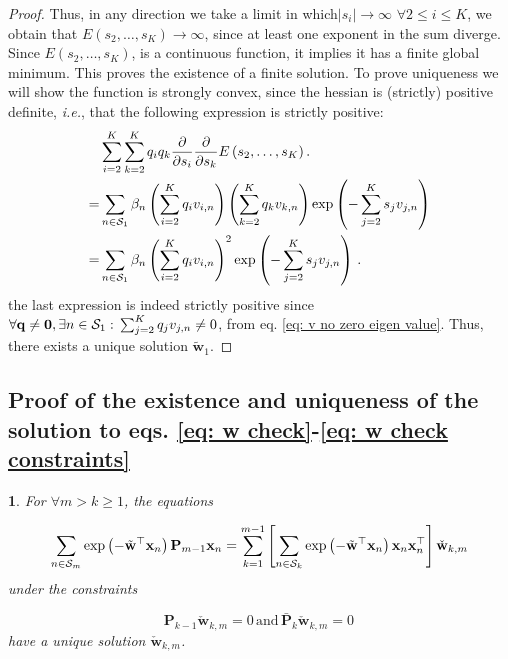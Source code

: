 \documentclass[twoside,11pt,english]{article}
\newtheorem{lem}[thm]{\protect\lemmaname}
\providecommand{\lemmaname}{Lemma}
\providecommand{\lemmaname}{Lemma}
\begin{document}
{\begin{proof}
Thus, in any direction we take a limit in which$\left|s_{i}\right|\rightarrow\infty$
$\forall2\leq i\leq K$, we obtain that $E\left(s_{2},\dots,s_{K}\right)\rightarrow\infty$,
since at least one exponent in the sum diverge. Since $E\left(s_{2},\dots,s_{K}\right)$,
is a continuous function, it implies it has a finite global minimum.
This proves the existence of a finite solution. To prove uniqueness
we will show the function is strongly convex, since the hessian is
(strictly) positive definite, \emph{i.e.}, that the following expression
is strictly positive: 
\begin{align*}
 & \sum_{i=2}^{K}\sum_{k=2}^{K}q_{i}q_{k}\frac{\partial}{\partial s_{i}}\frac{\partial}{\partial s_{k}}E\left(s_{2},\dots,s_{K}\right).\\
= & \sum_{n\in\mathcal{S}_{1}}\beta_{n}\left(\sum_{i=2}^{K}q_{i}v_{i,n}\right)\left(\sum_{k=2}^{K}q_{k}v_{k,n}\right)\exp\left(-\sum_{j=2}^{K}s_{j}v_{j,n}\right)\\
= & \sum_{n\in\mathcal{S}_{1}}\beta_{n}\left(\sum_{i=2}^{K}q_{i}v_{i,n}\right)^{2}\exp\left(-\sum_{j=2}^{K}s_{j}v_{j,n}\right)\,.
\end{align*}
the last expression is indeed strictly positive since $\forall\mathbf{q}\neq\mathbf{0},\exists n\in\mathcal{S}_{1}:\,\sum_{j=2}^{K}q_{j}v_{j,n}\neq0$,
from eq. \ref{eq: v no zero eigen value}. Thus, there exists a unique
solution $\tilde{\mathbf{w}}_{1}$. 
\end{proof}

\subsection{Proof of the existence and uniqueness of the solution to eqs. \ref{eq: w check}-\ref{eq: w check constraints}\label{subsec: existence 2}}
\begin{lem}
For $\forall m>k\geq1$, the equations

\begin{equation}
\sum_{n\in\mathcal{S}_{m}}\exp\left(-\tilde{\mathbf{w}}^{\top}\mathbf{x}_{n}\right)\mathbf{P}_{m-1}\mathbf{x}_{n}=\sum_{k=1}^{m-1}\left[\sum_{n\in\mathcal{S}_{k}}\exp\left(-\tilde{\mathbf{w}}^{\top}\mathbf{x}_{n}\right)\mathbf{x}_{n}\mathbf{x}_{n}^{\top}\right]\check{\mathbf{w}}_{k,m}\label{eq: w check proof}
\end{equation}
under the constraints

\begin{equation}
\mathbf{P}_{k-1}\check{\mathbf{w}}_{k,m}=0\,\mathrm{and}\,\mathbf{\bar{P}}_{k}\check{\mathbf{w}}_{k,m}=0\,\label{eq: w check constraints-1}
\end{equation}
have a unique solution $\check{\mathbf{w}}_{k,m}$.
\end{lem}

}
\end{document}
